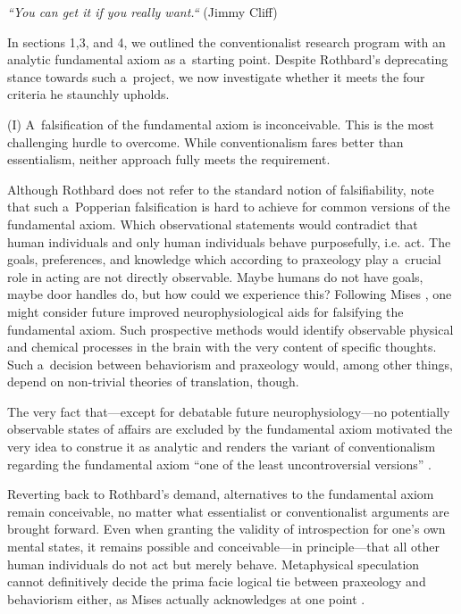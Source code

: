 \textit{``You can get it if you really want.``} (Jimmy Cliff)





In sections 1,3, and 4, we outlined the conventionalist research program with an analytic fundamental axiom as a~starting point. Despite Rothbard's deprecating stance towards such a~project, we now investigate whether it meets the four criteria he staunchly upholds.



(I) A~falsification of the fundamental axiom is inconceivable. This is the most challenging hurdle to overcome. While conventionalism fares better than essentialism, neither approach fully meets the requirement.



Although Rothbard does not refer to the standard notion of falsifiability, note that such a~Popperian falsification is hard to achieve for common versions of the fundamental axiom. Which observational statements would contradict that human individuals and only human individuals behave purposefully, i.e. act. The goals, preferences, and knowledge which according to praxeology play a~crucial role in acting are not directly observable. Maybe humans do not have goals, maybe door handles do, but how could we experience this? Following Mises 
\parencite*[][p.85]{mises_nationalokonomie_1940}, %
 one might consider future improved neurophysiological aids for falsifying the fundamental axiom. Such prospective methods would identify observable physical and chemical processes in the brain with the very content of specific thoughts. Such a~decision between behaviorism and praxeology would, among other things, depend on non-trivial theories of translation, though.



The very fact that---except for debatable future neurophysiology---no potentially observable states of affairs are excluded by the fundamental axiom motivated the very idea to construe it as analytic and renders the variant of conventionalism regarding the fundamental axiom ``one of the least uncontroversial versions'' 
\parencite[][p.3371]{linsbichler_austrian_2021}.%




Reverting back to Rothbard's demand, alternatives to the fundamental axiom remain conceivable, no matter what essentialist or conventionalist arguments are brought forward. Even when granting the validity of introspection for one's own mental states, it remains possible and conceivable---in principle---that all other human individuals do not act but merely behave. Metaphysical speculation cannot definitively decide the prima facie logical tie between praxeology and behaviorism either, as Mises actually acknowledges at one point 
\parencite[][pp.84–86]{mises_nationalokonomie_1940}.%





